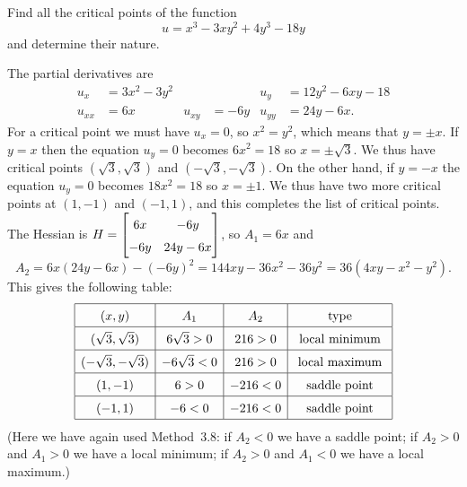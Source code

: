 \documentclass[a4paper]{amsart}
\renewenvironment{solution}{\SolutionInline}{\endSolutionInline}
\begin{document}
\begin{exercise}
 Find all the critical points of the function
 \[ u = x^3-3xy^2+4y^3-18y \]
 and determine their nature.
\end{exercise}
\begin{solution}
 The partial derivatives are
 \begin{align*}
  u_x &= 3x^2-3y^2 &&& u_y &= 12y^2-6xy-18 \\
  u_{xx} &= 6x & u_{xy} &= -6y & u_{yy} &= 24y-6x.
 \end{align*}
 For a critical point we must have $u_x=0$, so $x^2=y^2$, which means
 that $y=\pm x$.  If $y=x$ then the equation $u_y=0$ becomes $6x^2=18$
 so $x=\pm\sqrt{3}$.  We thus have critical points
 $(\sqrt{3},\sqrt{3})$ and $(-\sqrt{3},-\sqrt{3})$.  On the other
 hand, if $y=-x$ the equation $u_y=0$ becomes $18x^2=18$ so
 $x=\pm 1$.  We thus have two more critical points at $(1,-1)$ and
 $(-1,1)$, and this completes the list of critical points.  The
 Hessian is $H=\bbm 6x&-6y \\ -6y&24y-6x\ebm$, so $A_1=6x$ and 
 \[ A_2=6x(24y-6x) - (-6y)^2 = 144xy-36x^2-36y^2 = 36(4xy-x^2-y^2). \]
 This gives the following table:
 \[ \renewcommand{\arraystretch}{1.5}
    \begin{array}{|c|c|c|c|}
     \hline
     (x,y) & A_1 & A_2 & \text{type} \\ \hline
     ( \sqrt{3}, \sqrt{3}) &  6\sqrt{3}>0 &  216>0 & \text{ local minimum } \\ \hline
     (-\sqrt{3},-\sqrt{3}) & -6\sqrt{3}<0 &  216>0 & \text{ local maximum } \\ \hline
     (1,-1)                &  6>0         & -216<0  & \text{ saddle point  } \\ \hline
     (-1,1)                & -6<0         & -216<0  & \text{ saddle point  } \\ \hline 
    \end{array}
 \]
 (Here we have again used Method~3.8: if $A_2<0$ we have a saddle point;
 if $A_2>0$ and $A_1>0$ we have a local minimum; if $A_2>0$ and $A_1<0$ 
 we have a local maximum.)
\end{solution}
\end{document}

